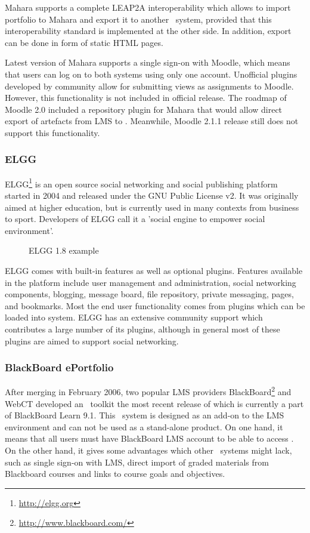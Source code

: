 Mahara supports a complete LEAP2A interoperability which allows to import
portfolio to Mahara and export it to another \ep~system, provided that this
interoperability standard is implemented at the other side. In addition, export
can be done in form of static HTML pages.

Latest version of Mahara supports a single sign-on with Moodle, which means that
users can log on to both systems using only one account. Unofficial plugins
developed by community allow for submitting views as assignments to Moodle.
However, this functionality is not included in official release. The roadmap of
Moodle 2.0 included a repository plugin for Mahara that would allow direct
export of artefacts from LMS to \ep. Meanwhile, Moodle 2.1.1 release still does
not support this functionality.

\subsubsection{ELGG}
ELGG\footnote{\url{http://elgg.org}} is an open source social networking and
social publishing platform started in 2004 and released under the GNU Public
License v2. It was originally aimed at higher education, but is currently used
in many contexts from business to sport. Developers of ELGG call it a 'social
engine to empower social environment'.

\begin{figure}[htb]
\centering
\setlength\fboxsep{0pt}
\setlength\fboxrule{0.5pt}
\caption{ELGG 1.8 example}
\label{fig:elgg}
\end{figure}

ELGG comes with built-in features as well as optional plugins. Features
available in the platform include user management and administration, social
networking components, blogging, message board, file repository, private
messaging, pages, and bookmarks. Most the end user functionality comes from
plugins which can be loaded into system. ELGG has an extensive community support
which contributes a large number of its plugins, although in general most of
these plugins are aimed to support social networking.

\subsubsection{BlackBoard ePortfolio}
After merging in February 2006, two popular LMS providers
BlackBoard\footnote{\url{http://www.blackboard.com/}} and WebCT developed an
\ep~toolkit the most recent release of which is currently a part of BlackBoard
Learn 9.1. This \ep~system is designed as an add-on to the LMS environment and
can not be used as a stand-alone product. On one hand, it means that all users
must have BlackBoard LMS account to be able to access \ep. On the other hand, it
gives some advantages which other \ep~systems might lack, such as single sign-on
with LMS, direct import of graded materials from Blackboard courses and links to
course goals and objectives.

